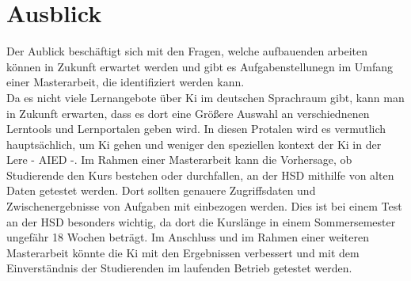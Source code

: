 \chapter{Ausblick} 
Der Aublick beschäftigt sich mit den Fragen, welche aufbauenden arbeiten können in Zukunft erwartet werden und gibt es Aufgabenstellunegn im Umfang einer Masterarbeit, die identifiziert werden kann.
\\ \noindent
Da es nicht viele Lernangebote über Ki im deutschen Sprachraum gibt, kann man in Zukunft erwarten, dass es dort eine Größere Auswahl an verschiednenen Lerntools und Lernportalen geben wird.
In diesen Protalen wird es vermutlich hauptsächlich, um Ki gehen und weniger den speziellen kontext der Ki in der Lere - AIED -.
Im Rahmen einer Masterarbeit kann die Vorhersage, ob Studierende den Kurs bestehen oder durchfallen, an der HSD mithilfe von alten Daten getestet werden.
Dort sollten genauere Zugriffsdaten und Zwischenergebnisse von Aufgaben mit einbezogen werden. Dies ist bei einem Test an der HSD besonders wichtig, da dort die Kurslänge in einem Sommersemester ungefähr 18 Wochen beträgt.
Im Anschluss und im Rahmen einer weiteren Masterarbeit könnte die Ki mit den Ergebnissen verbessert und mit dem Einverständnis der Studierenden im laufenden Betrieb getestet werden.
